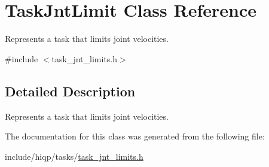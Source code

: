 \hypertarget{classTaskJntLimit}{\section{Task\-Jnt\-Limit Class Reference}
\label{classTaskJntLimit}
}


Represents a task that limits joint velocities.  




{\ttfamily \#include $<$task\-\_\-jnt\-\_\-limits.\-h$>$}



\subsection{Detailed Description}
Represents a task that limits joint velocities. 

The documentation for this class was generated from the following file\-:\begin{DoxyCompactItemize}
\item 
include/hiqp/tasks/\hyperlink{task__jnt__limits_8h}{task\-\_\-jnt\-\_\-limits.\-h}\end{DoxyCompactItemize}
